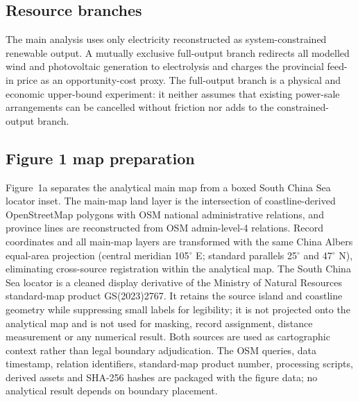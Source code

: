 \documentclass[11pt,a4paper]{article}
\begin{document}
\subsection{Resource branches}

The main analysis uses only electricity reconstructed as system-constrained renewable output. A mutually exclusive full-output branch redirects all modelled wind and photovoltaic generation to electrolysis and charges the provincial feed-in price as an opportunity-cost proxy. The full-output branch is a physical and economic upper-bound experiment: it neither assumes that existing power-sale arrangements can be cancelled without friction nor adds to the constrained-output branch.

\subsection{Figure 1 map preparation}

Figure~1a separates the analytical main map from a boxed South China Sea locator inset. The main-map land layer is the intersection of coastline-derived OpenStreetMap polygons with OSM national administrative relations, and province lines are reconstructed from OSM admin-level-4 relations\cite{osmcoast}. Record coordinates and all main-map layers are transformed with the same China Albers equal-area projection (central meridian 105$^\circ$ E; standard parallels 25$^\circ$ and 47$^\circ$ N), eliminating cross-source registration within the analytical map. The South China Sea locator is a cleaned display derivative of the Ministry of Natural Resources standard-map product GS(2023)2767\cite{mnrmap2023}. It retains the source island and coastline geometry while suppressing small labels for legibility; it is not projected onto the analytical map and is not used for masking, record assignment, distance measurement or any numerical result. Both sources are used as cartographic context rather than legal boundary adjudication. The OSM queries, data timestamp, relation identifiers, standard-map product number, processing scripts, derived assets and SHA-256 hashes are packaged with the figure data; no analytical result depends on boundary placement.
\end{document}
